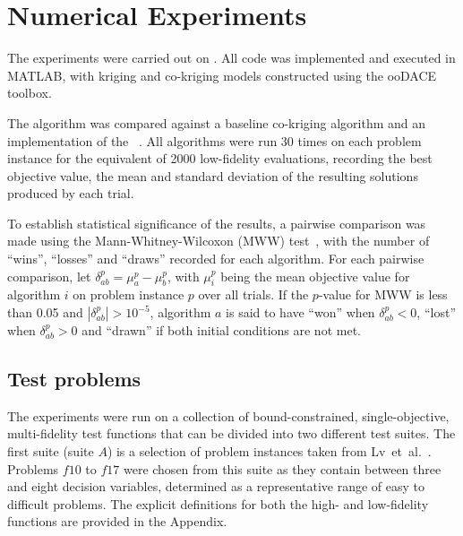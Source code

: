 \section{Numerical Experiments}\label{sec:exp}
The experiments were carried out on . All code was implemented and executed in MATLAB, with kriging and co-kriging models constructed using the ooDACE toolbox.

The \AlgName{} algorithm was compared against a baseline co-kriging algorithm and an implementation of the \motos{}~\cite{xu2016mo2tos}. All algorithms were run 30 times on each problem instance for the equivalent of 2000 low-fidelity evaluations, recording the best objective value, the mean and standard deviation of the resulting solutions produced by each trial.

To establish statistical significance of the results, a pairwise comparison was made using the Mann-Whitney-Wilcoxon (MWW) test~\cite{mann1947test}, with the number of ``wins'', ``losses'' and ``draws'' recorded for each algorithm. For each pairwise comparison, let $\delta^p_{ab} = \mu^p_a - \mu^p_b$, with $\mu^p_i$ being the mean objective value for algorithm $i$ on problem instance $p$ over all trials. If the $p$-value for MWW is less than 0.05 and $|\delta^p_{ab}| > 10^{-5}$, algorithm $a$ is said to have ``won'' when $\delta^p_{ab} < 0$, ``lost'' when $\delta^p_{ab} > 0$ and ``drawn'' if both initial conditions are not met.

\subsection{Test problems}
The experiments were run on a collection of bound-constrained, single-objective, multi-fidelity test functions that can be divided into two different test suites. The first suite (suite $A$) is a selection of problem instances taken from Lv~et~al.~\cite{lv2021multi}. Problems $f10$ to $f17$ were chosen from this suite as they contain between three and eight decision variables, determined as a representative range of easy to difficult problems. The explicit definitions for both the high- and low-fidelity functions are provided in the Appendix.


